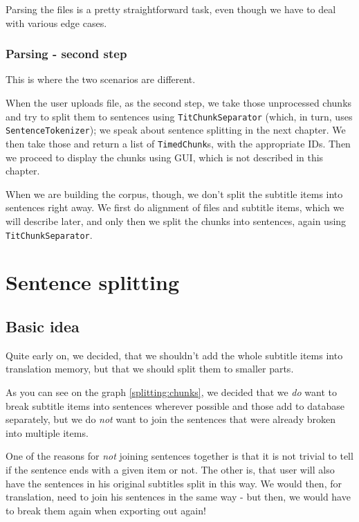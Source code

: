 Parsing the files is a pretty straightforward task, even though we have to deal with various edge cases.


\subsubsection*{Parsing - second step}
This is where the two scenarios are different. 

When the user uploads file, as the second step, we take those unprocessed chunks and try to split them to sentences using \texttt{TitChunkSeparator} (which, in turn, uses \texttt{SentenceTokenizer}); we speak about sentence splitting in the next chapter. We then take those and return a list of \texttt{TimedChunk}s, with the appropriate IDs. Then we proceed to display the chunks using GUI, which is not described in this chapter.

When we are building the corpus, though, we don't split the subtitle items into sentences right away. We first do alignment of files and subtitle items, which we will describe later, and only then we split the chunks into sentences, again using \texttt{TitChunkSeparator}.

\section{Sentence splitting}
\subsection*{Basic idea}
Quite early on, we decided, that we shouldn't add the whole subtitle items into translation memory, but that we should split them to smaller parts.

As you can see on the graph \ref{splitting:chunks}, we decided that we \emph{do} want to break subtitle items into sentences wherever possible and those add to database separately, but we do \emph{not} want to join the sentences that were already broken into multiple items. 

One of the reasons for \emph{not} joining sentences together is that it is not trivial to tell if the sentence ends with a given item or not. The other is, that user will also have the sentences in his original subtitles split in this way. We would then, for translation, need to join his sentences in the same way - but then, we would have to break them again when exporting out again!

